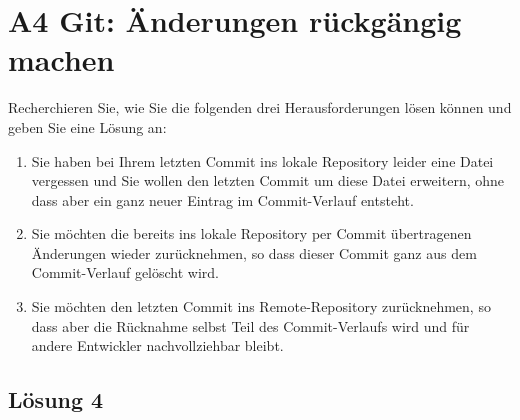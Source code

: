 \documentclass[main.tex]{subfiles}
\begin{document}
\section{A4 Git: Änderungen rückgängig machen}
Recherchieren Sie, wie Sie die folgenden drei Herausforderungen lösen können und geben Sie
eine Lösung an:

\begin{enumerate}
\item Sie haben bei Ihrem letzten Commit ins lokale Repository leider eine Datei vergessen und Sie wollen den letzten Commit um diese Datei erweitern, ohne dass aber ein ganz neuer Eintrag im Commit-Verlauf entsteht.
\item Sie möchten die bereits ins lokale Repository per Commit übertragenen Änderungen wieder zurücknehmen, so dass dieser Commit ganz aus dem Commit-Verlauf gelöscht wird.
\item Sie möchten den letzten Commit ins Remote-Repository zurücknehmen, so dass aber die Rücknahme selbst Teil des Commit-Verlaufs wird und für andere Entwickler nachvollziehbar bleibt.
\end{enumerate}


\subsection{Lösung 4}
\end{document}
